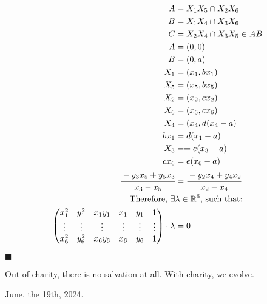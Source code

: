 \begin{align}
    A &= X_1 X_5 \cap X_2 X_6 \\
    B &= X_1 X_4 \cap X_3 X_6 \\
    C &= X_2 X_4 \cap X_3 X_5 \in AB \\
    A &= (0,0) \\
    B &= (0,a) \\
    X_1 &= (x_1, bx_1) \\
    X_5 &= (x_5, bx_5) \\
    X_2 &= (x_2, cx_2) \\
    X_6 &= (x_6, cx_6) \\
    X_4 &= (x_4, d(x_4 - a) \\
    bx_1 &= d(x_1 - a) \\
    X_3 &== e(x_3 - a) \\
    cx_6 &= e(x_6 - a) \\
    \cfrac{-y_3 x_5 + y_5 x_3}{x_3 - x_5} &= \cfrac{-y_2 x_4 + y_4 x_2}{x_2 - x_4} \\
    \text{Therefore, } \exists &\lambda\in\mathbb{R}^6\text{, such that:} \nonumber \\
    \begin{pmatrix}
        x_1^2 & y_1^2 & x_1 y_1 & x_1 & y_1 & 1 \\
        \vdots & \vdots & \vdots & \vdots & \vdots & \vdots \\
        x_6^2 & y_6^2 & x_6 y_6 & x_6 & y_6 & 1 
    \end{pmatrix}\cdot \lambda &= 0
\end{align}

$\blacksquare$

Out of charity, there is no salvation at all. With charity, we evolve.

June, the 19th, 2024.

%
